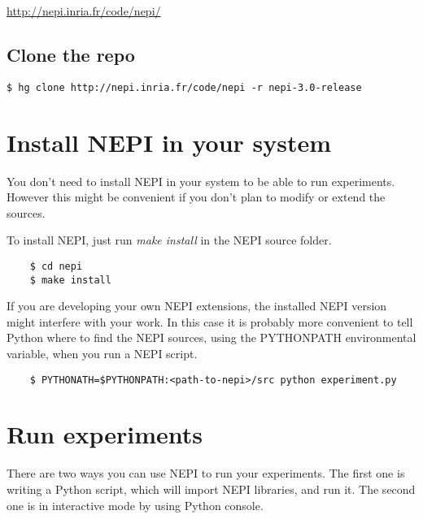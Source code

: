 \url{http://nepi.inria.fr/code/nepi/} 

\subsection{Clone the repo}

\begingroup
    \fontsize{10pt}{12pt}\selectfont

\begin{verbatim}
$ hg clone http://nepi.inria.fr/code/nepi -r nepi-3.0-release
\end{verbatim}

\endgroup

\section{Install NEPI in your system}

You don't need to install NEPI in your system to be able to run 
experiments. However this might be convenient if you don't 
plan to modify or extend the sources.

To install NEPI, just run \emph{make install} in the NEPI source
folder.

\begingroup
    \fontsize{10pt}{12pt}\selectfont

\begin{verbatim}
    $ cd nepi
    $ make install 
\end{verbatim}

\endgroup

If you are developing your own NEPI extensions, the installed 
NEPI version might interfere with your work.
In this case it is probably more convenient to tell
Python where to find the NEPI sources, using the PYTHONPATH
environmental variable, when you run a NEPI script.

\begingroup
    \fontsize{10pt}{12pt}\selectfont

\begin{verbatim}
    $ PYTHONATH=$PYTHONPATH:<path-to-nepi>/src python experiment.py
\end{verbatim}

\endgroup

\section{Run experiments}

There are two ways you can use NEPI to run your experiments.
The first one is writing a Python script, which will import
NEPI libraries, and run it. 
The second one is in interactive mode by using Python console.


